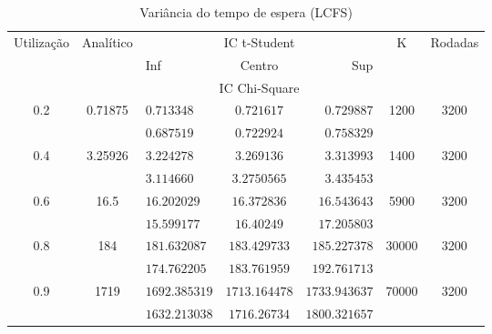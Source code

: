 \documentclass[a4paper]{article}
\begin{document}
\begin{table}[h!]
    \centering
    \begin{tabular}{|c|c|lcr|c|c|}\hline
        \multirow{2}{4.35em}{Utilização}
            & \multirow{3}{3.95em}{Analítico}
            & \multicolumn{3}{|c|}{IC t-Student}
            & \multirow{3}{1em}{K}
            & \multirow{3}{3.75em}{Rodadas} \\
        && Inf & Centro & Sup &&\\
        && \multicolumn{3}{|c|}{IC Chi-Square} &&\\\hline
        \multirow{2}{2em}{0.2}
            &\multirow{2}{3em}{0.71875}
            &$ 0.713348 $&$ 0.721617 $&$ 0.729887 $
            &\multirow{2}{2em}{1200} & \multirow{2}{2em}{3200}\\
            &&$ 0.687519 $&$ 0.722924 $&$ 0.758329 $&&\\\hline
        \multirow{2}{2em}{0.4}
            &\multirow{2}{3em}{3.25926}
            &$ 3.224278 $&$ 3.269136 $&$ 3.313993 $
            &\multirow{2}{2em}{1400} & \multirow{2}{2em}{3200}\\
            &&$ 3.114660 $&$ 3.2750565 $&$ 3.435453  $&&\\\hline
        \multirow{2}{2em}{0.6}
            &\multirow{2}{2em}{16.5}
            &$ 16.202029 $&$ 16.372836 $&$ 16.543643 $
            &\multirow{2}{2em}{5900} & \multirow{2}{2em}{3200}\\
            &&$ 15.599177 $&$ 16.40249  $&$ 17.205803 $&&\\\hline
        \multirow{2}{2em}{0.8}
            &\multirow{2}{2em}{184}
            &$ 181.632087 $&$ 183.429733 $&$ 185.227378 $
            &\multirow{2}{2em}{30000} & \multirow{2}{2em}{3200}\\
            &&$ 174.762205 $&$ 183.761959 $&$ 192.761713 $&&\\\hline
        \multirow{2}{2em}{0.9}
            &\multirow{2}{2em}{1719}
            &$ 1692.385319 $&$ 1713.164478 $&$ 1733.943637 $
            &\multirow{2}{2.5em}{70000} & \multirow{2}{2em}{3200}\\
            &&$ 1632.213038 $&$ 1716.26734 $&$ 1800.321657 $&&\\\hline
    \end{tabular}
    \caption{Variância do tempo de espera (LCFS)}
\end{table}
\end{document}

